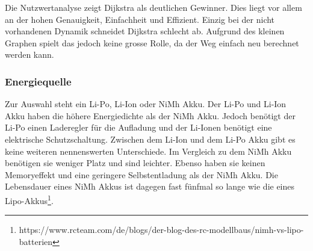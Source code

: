 \documentclass[../main.tex]{subfiles}
\begin{document}
Die Nutzwertanalyse zeigt Dijkstra als deutlichen Gewinner. Dies liegt vor allem an der hohen Genauigkeit, Einfachheit und Effizient. Einzig bei der nicht vorhandenen Dynamik schneidet Dijkstra schlecht ab. Aufgrund des kleinen Graphen spielt das jedoch keine grosse Rolle, da der Weg einfach neu berechnet werden kann.

\subsubsection{Energiequelle}
Zur Auswahl steht ein Li-Po, Li-Ion oder NiMh Akku. Der Li-Po und Li-Ion Akku haben die höhere Energiedichte als der NiMh Akku. Jedoch benötigt der Li-Po einen Laderegler für die Aufladung und der Li-Ionen benötigt eine elektrische Schutzschaltung. Zwischen dem Li-Ion und dem Li-Po Akku gibt es keine weiteren nennenswerten Unterschiede. 
Im Vergleich zu dem NiMh Akku benötigen sie weniger Platz und sind leichter. Ebenso haben sie keinen Memoryeffekt und eine geringere Selbstentladung als der NiMh Akku. Die Lebensdauer eines NiMh Akkus ist dagegen fast fünfmal so lange wie die eines Lipo-Akkus\footnote{https://www.rcteam.com/de/blogs/der-blog-des-rc-modellbaus/nimh-vs-lipo-batterien}.


\begin{table}[H]
            \caption{Nutzwertanalyse Akku}
            \label{tab:konzept_Akku}
        \end{table}
        
\end{document}
